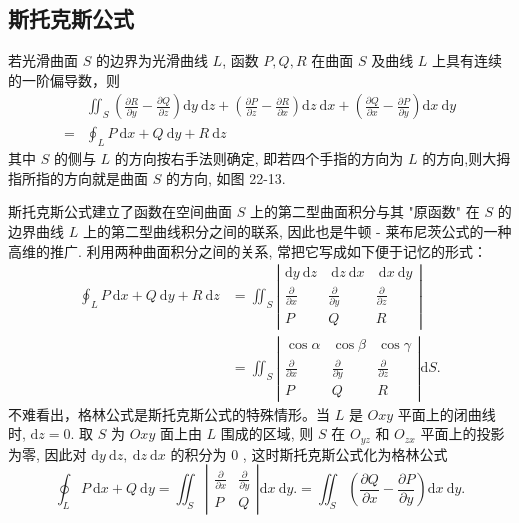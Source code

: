 \subsection{斯托克斯公式}

\begin{theorem}[斯托克斯公式]
    若光滑曲面 $S$ 的边界为光滑曲线 $L$, 函数 $P, Q, R$ 在曲面 $S$ 及曲线 $L$ 上具有连续的一阶偏导数，则
    $$
    \begin{aligned}
    & \iint_S\left(\frac{\partial R}{\partial y}-\frac{\partial Q}{\partial z}\right) \mathrm{d} y \mathrm{~d} z+\left(\frac{\partial P}{\partial z}-\frac{\partial R}{\partial x}\right) \mathrm{d} z \mathrm{~d} x+\left(\frac{\partial Q}{\partial x}-\frac{\partial P}{\partial y}\right) \mathrm{d} x \mathrm{~d} y \\
    = & \oint_L P \mathrm{~d} x+Q \mathrm{~d} y+R \mathrm{~d} z
    \end{aligned}
    $$
    其中 $S$ 的侧与 $L$ 的方向按右手法则确定, 即若四个手指的方向为 $L$ 的方向,则大拇指所指的方向就是曲面 $S$ 的方向, 如图 22-13.
\end{theorem}

斯托克斯公式建立了函数在空间曲面 $S$ 上的第二型曲面积分与其 "原函数" 在 $S$ 的边界曲线 $L$ 上的第二型曲线积分之间的联系, 因此也是牛顿 - 莱布尼茨公式的一种高维的推广. 利用两种曲面积分之间的关系, 常把它写成如下便于记忆的形式：
$$
\begin{aligned}
\oint_L P \mathrm{~d} x+Q \mathrm{~d} y+R \mathrm{~d} z
& =\iint_S\left|\begin{array}{ccc}
\mathrm{d} y \mathrm{~d} z & \mathrm{~d} z \mathrm{~d} x & \mathrm{~d} x \mathrm{~d} y \\
\frac{\partial}{\partial x} & \frac{\partial}{\partial y} & \frac{\partial}{\partial z} \\
P & Q & R
\end{array}\right| \\
& =\iint_S\left|\begin{array}{ccc}
\cos \alpha & \cos \beta & \cos \gamma \\
\frac{\partial}{\partial x} & \frac{\partial}{\partial y} & \frac{\partial}{\partial z} \\
P & Q & R
\end{array}\right| \mathrm{d} S .
\end{aligned}
$$
不难看出，格林公式是斯托克斯公式的特殊情形。当 $L$ 是 $O x y$ 平面上的闭曲线时, $\mathrm{d} z=0$. 取 $S$ 为 $O x y$ 面上由 $L$ 围成的区域, 则 $S$ 在 $O_{y z}$ 和 $O_{z x}$ 平面上的投影为零, 因此对 $\mathrm{d} y \mathrm{~d} z, \mathrm{~d} z \mathrm{~d} x$ 的积分为 0 , 这时斯托克斯公式化为格林公式
$$
\oint_L P \mathrm{~d} x+Q \mathrm{~d} y=\iint_S\left|\begin{array}{cc}
\frac{\partial}{\partial x} & \frac{\partial}{\partial y} \\
P & Q
\end{array}\right| \mathrm{d} x \mathrm{~d} y .=\iint_S\left(\frac{\partial Q}{\partial x}-\frac{\partial P}{\partial y}\right) \mathrm{d} x \mathrm{~d} y .
$$

